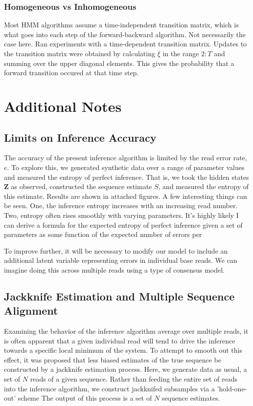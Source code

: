 \subsubsection{Homogeneous vs Inhomogeneous}
Most HMM algorithms assume a time-independent transition matrix, which is what goes into each step of the forward-backward algorithm. Not necessarily the case here. Ran experiments with a time-dependent transition matrix. Updates to the transition matrix were obtained by calculating $\xi$ in the range $2:T$ and summing over the upper diagonal elements. This gives the probability that a forward transition occured at that time step. 



\section{Additional Notes}

\subsection{Limits on Inference Accuracy}
The accuracy of the present inference algorithm is limited by the read error rate, $e$. To explore this, we generated synthetic data over a range of parameter values and measured the entropy of perfect inference. That is, we took the hidden states $\mathbf{Z}$ as observed, constructed the sequence estimate $S$, and measured the entropy of this estimate. Results are shown in attached figures. A few interesting things can be seen. One, the inference entropy increases with an increasing read number. Two, entropy often rises smoothly with varying parameters. It's highly likely I can derive a formula for the expected entropy of perfect inference given a set of parameters as some function of the expected number of errors per 

To improve further, it will be necessary to modify our model to include an additional latent variable representing errors in individual base reads. We can imagine doing this across multiple reads using a type of consensus model.

\subsection{Jackknife Estimation and Multiple Sequence Alignment}
Examining the behavior of the inference algorithm average over multiple reads, it is often apparent that a given individual read will tend to drive the inference towards a specific local minimum of the system. To attempt to smooth out this effect, it was proposed that less biased estimates of the true sequence be constructed by a jackknife estimation process. Here, we generate data as usual, a set of $N$ reads of a given sequence. Rather than feeding the entire set of reads into the inference algorithm, we construct jackknifed subsamples via a 'hold-one-out' scheme The output of this process is a set of $N$ sequence estimates. 

